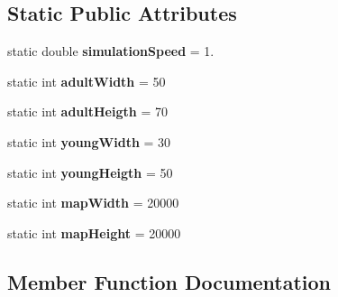 \subsection*{Static Public Attributes}
\begin{DoxyCompactItemize}
\item 
\hypertarget{class_parameters_ac42d2e7c0e70f4c9def9395b437d7fe3}{}static double {\bfseries simulation\+Speed} = 1.\label{class_parameters_ac42d2e7c0e70f4c9def9395b437d7fe3}

\item 
\hypertarget{class_parameters_a9e8b2f3ffa5097236e933baa457d925c}{}static int {\bfseries adult\+Width} = 50\label{class_parameters_a9e8b2f3ffa5097236e933baa457d925c}

\item 
\hypertarget{class_parameters_a96a472acc0bea5e085e539bc37887e7d}{}static int {\bfseries adult\+Heigth} = 70\label{class_parameters_a96a472acc0bea5e085e539bc37887e7d}

\item 
\hypertarget{class_parameters_a738bb8522f1b522d88381f468f908053}{}static int {\bfseries young\+Width} = 30\label{class_parameters_a738bb8522f1b522d88381f468f908053}

\item 
\hypertarget{class_parameters_a8134022f027e5bce2e4595c29e7daabc}{}static int {\bfseries young\+Heigth} = 50\label{class_parameters_a8134022f027e5bce2e4595c29e7daabc}

\item 
\hypertarget{class_parameters_aa18640156cfa58c00dea2dcadb17efc8}{}static int {\bfseries map\+Width} = 20000\label{class_parameters_aa18640156cfa58c00dea2dcadb17efc8}

\item 
\hypertarget{class_parameters_a819544c29d5c205ae99b3973e0b30a9c}{}static int {\bfseries map\+Height} = 20000\label{class_parameters_a819544c29d5c205ae99b3973e0b30a9c}

\end{DoxyCompactItemize}


\subsection{Member Function Documentation}
\hypertarget{class_parameters_a6d84a2dc3c36144dc054a8516fce43cc}{}
